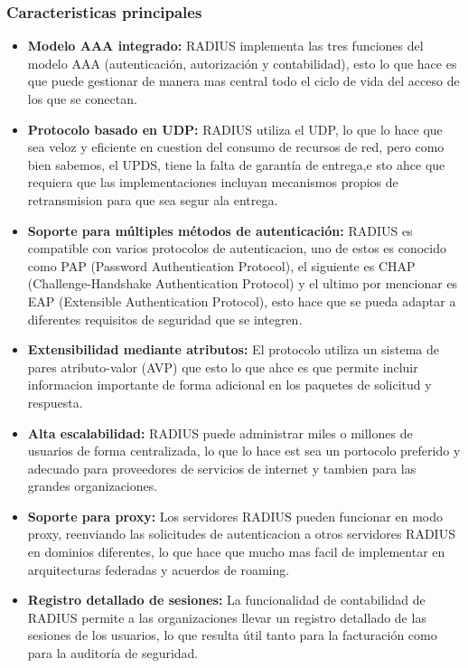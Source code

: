 \documentclass[letterpaper,12pt]{article}
\begin{document}
\subsubsection{Caracteristicas principales}


\begin{itemize}[leftmargin=2cm]
  \item \textbf{Modelo AAA integrado:} RADIUS implementa las tres funciones del modelo AAA (autenticaci\'on, autorizaci\'on y contabilidad), 
  esto lo que hace es que puede gestionar de manera mas central todo el ciclo de vida del acceso de los que se conectan.
  \item \textbf{Protocolo basado en UDP:} RADIUS utiliza el UDP, lo que lo hace que sea veloz y eficiente 
  en cuestion del consumo de recursos de red, pero como bien sabemos, el UPDS, tiene la falta 
  de garant\'ia de entrega,e sto ahce que requiera que las implementaciones incluyan mecanismos propios de retransmision para que sea 
  segur ala entrega.
  \item \textbf{Soporte para m\'ultiples m\'etodos de autenticaci\'on:} RADIUS es compatible con varios 
  protocolos de autenticacion, uno de estos es conocido como PAP (Password Authentication Protocol), el siguiente es 
  CHAP (Challenge-Handshake Authentication Protocol) y el ultimo por mencionar es EAP (Extensible Authentication Protocol), 
  esto hace que se pueda adaptar a diferentes requisitos de seguridad que se integren.
  \item \textbf{Extensibilidad mediante atributos:} El protocolo utiliza un sistema de pares atributo-valor 
  (AVP) que esto lo que ahce es que permite incluir informacion importante de forma adicional en los paquetes de 
  solicitud y respuesta. 

  \item \textbf{Alta escalabilidad:} RADIUS puede administrar miles o millones de usuarios de forma centralizada,
  lo que lo hace est sea un portocolo preferido y adecuado para proveedores de servicios de internet y
   tambien para las grandes organizaciones.
  \item \textbf{Soporte para proxy:} Los servidores RADIUS pueden funcionar en modo proxy,
  reenviando las solicitudes de autenticacion a otros servidores RADIUS en dominios diferentes, 
  lo que hace que mucho mas facil de implementar en arquitecturas federadas y acuerdos de roaming.
  \item \textbf{Registro detallado de sesiones:} La funcionalidad de contabilidad de RADIUS permite a las organizaciones llevar un registro detallado de las sesiones de los usuarios, lo que resulta \'util tanto para la facturaci\'on como para la auditor\'ia de seguridad.
\end{itemize}
\end{document}
